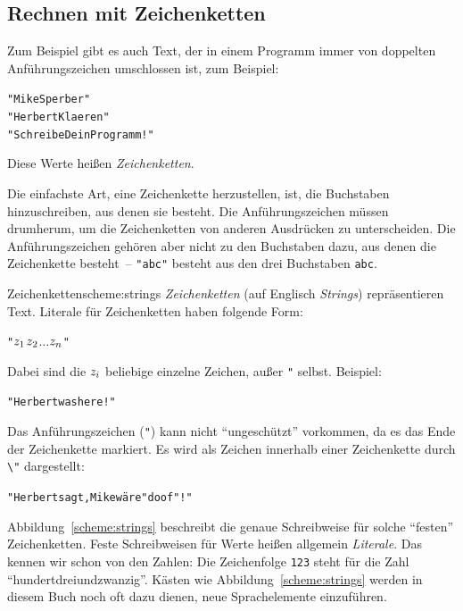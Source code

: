 \subsection{Rechnen mit Zeichenketten}

Zum Beispiel gibt es auch Text, der in einem Programm immer von
doppelten Anführungszeichen umschlossen ist, zum Beispiel:
%
\begin{alltt}
"Mike Sperber"
"Herbert Klaeren"
"Schreibe Dein Programm!"
\end{alltt}
%
Diese Werte heißen \textit{Zeichenketten}.

Die einfachste Art, eine Zeichenkette herzustellen, ist, die
Buchstaben hinzuschreiben, aus denen sie besteht.  Die
Anführungszeichen müssen drumherum, um die Zeichenketten von anderen
Ausdrücken zu unterscheiden.  Die Anführungszeichen gehören aber nicht
zu den Buchstaben dazu, aus denen die Zeichenkette besteht~--
\verb|"abc"| besteht aus den drei Buchstaben \texttt{abc}.

\begin{feature}{Zeichenketten}{scheme:strings}
\textit{Zeichenketten} (auf Englisch
\textit{Strings}) repräsentieren Text.
Literale für Zeichenketten haben folgende Form:
%
\begin{alltt}
"\(z\sb{1}\)\(z\sb{2}\) \(\ldots\) \(z\sb{n}\)"
\end{alltt}
%
Dabei sind die \(z\sb{i}\) beliebige einzelne Zeichen, außer \verb|"| selbst.
Beispiel:
%
\begin{alltt}
"Herbert was here!"
\end{alltt}
%
Das Anführungszeichen (\verb|"|) kann nicht "`ungeschützt"' vorkommen, da es das Ende der
Zeichenkette markiert. Es wird als Zeichen innerhalb einer Zeichenkette
durch \verb|\"| dargestellt:
%
\begin{alltt}
"Herbert sagt, Mike wäre \backwhack{}"doof\backwhack{}"!"
\end{alltt}
\end{feature}

Abbildung~\ref{scheme:strings} beschreibt die genaue Schreibweise für
solche "`festen"' Zeichenketten.  Feste Schreibweisen für Werte heißen
allgemein \textit{Literale}.  Das kennen wir schon von
den Zahlen: Die Zeichenfolge \texttt{123} steht für die Zahl
"`hundertdreiundzwanzig"'.  Kästen wie Abbildung~\ref{scheme:strings}
werden in diesem Buch noch oft dazu dienen, neue Sprachelemente
einzuführen.

